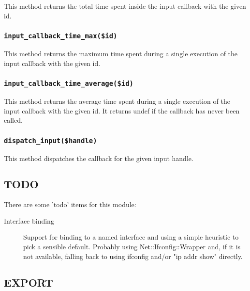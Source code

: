 This method returns the total time spent inside the input callback with
the given id.

\subsubsection*{\texttt{input\_callback\_time\_max(\$id)}\label{xPL::Listener_input_callback_time_max_id_}}


This method returns the maximum time spent during a single execution
of the input callback with the given id.

\subsubsection*{\texttt{input\_callback\_time\_average(\$id)}\label{xPL::Listener_input_callback_time_average_id_}}


This method returns the average time spent during a single execution
of the input callback with the given id.  It returns undef if the
callback has never been called.

\subsubsection*{\texttt{dispatch\_input(\$handle)}\label{xPL::Listener_dispatch_input_handle_}}


This method dispatches the callback for the given input handle.

\subsection*{TODO\label{xPL::Listener_TODO}}


There are some 'todo' items for this module:

\begin{description}

\item[{Interface binding}] \mbox{}

Support for binding to a named interface and using a simple heuristic
to pick a sensible default.  Probably using Net::Ifconfig::Wrapper
and, if it is not available, falling back to using ifconfig and/or "ip
addr show" directly.

\end{description}
\subsection*{EXPORT\label{xPL::Listener_EXPORT}}


